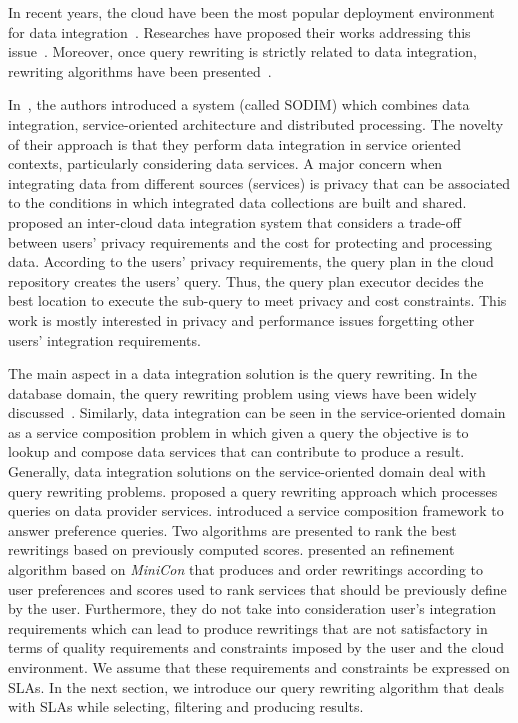 In recent years, the cloud have been the most popular deployment environment for data integration~\cite{Carvalho2015}. Researches have proposed their works addressing this issue~\cite{ElSheikh2013,Tian2010}.
Moreover, once query rewriting is strictly related to data integration, rewriting algorithms have been presented~\cite{ba2014,Barhamgi2010,Benouaret2011}.

In~\cite{ElSheikh2013}, the authors introduced a system (called SODIM) which combines data
integration, service-oriented architecture and distributed processing.
The novelty of their approach is that they perform data integration 
in service oriented contexts, particularly considering data services. 
A major concern when integrating data from different sources (services) is privacy that can 
be associated to the conditions in which integrated data collections are built and shared. 
\cite{Tian2010} proposed an inter-cloud data integration system that considers a trade-off
between users' privacy requirements and the cost for protecting and processing data. 
According to the users' privacy requirements, the query plan in the cloud repository 
creates the users' query. 
Thus, the query plan executor decides the best location to execute the sub-query to 
meet privacy and cost constraints.
This work is mostly interested in privacy and performance issues forgetting other users' 
integration requirements.

The main aspect in a data integration solution is the query rewriting. 
In the database domain, the query rewriting problem using views have been widely discussed~\cite{Halevy:2001}.
Similarly, data integration can be seen in the service-oriented domain as a service composition problem in which given a query the objective is to lookup and compose data services that can contribute to produce a result.
Generally, data integration solutions on the service-oriented domain deal with
query rewriting problems. 
\cite{Barhamgi2010} proposed a query rewriting approach which processes queries on data provider services.
\cite{Benouaret2011} introduced a service composition framework to answer
preference queries. Two algorithms are presented to rank the best rewritings based on previously computed scores.
\cite{ba2014} presented an refinement algorithm based
on \textit{MiniCon} that produces and order rewritings according to user preferences and scores used to rank services that should be previously define by the user.
Furthermore, they do not take into consideration user's integration requirements which can lead to produce rewritings that are not satisfactory in terms of quality requirements and constraints imposed by the user and the cloud environment. 
We assume that these requirements and constraints be expressed on SLAs. 
In the next section, we introduce our query rewriting algorithm that deals with SLAs while selecting, filtering and producing results.